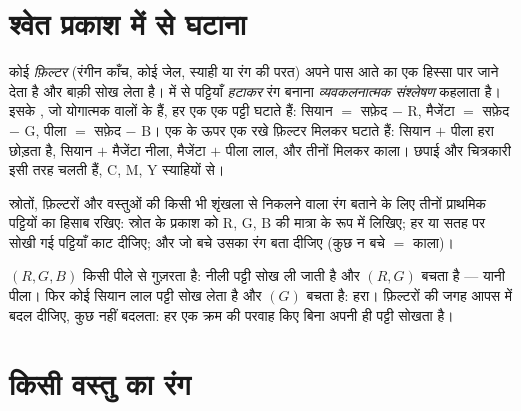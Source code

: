 \section{श्वेत प्रकाश में से घटाना}

\begin{definition}[व्यवकलनात्मक संश्लेषण]\label{def:g11:color-light-sources:subtractive}
कोई \emph{फ़िल्टर} (रंगीन काँच, कोई जेल, स्याही या रंग की
परत) अपने पास आते  का एक हिस्सा पार जाने देता है और बाक़ी
सोख लेता है।  में से पट्टियाँ \emph{हटाकर} रंग बनाना
\emph{व्यवकलनात्मक संश्लेषण} कहलाता है।
इसके , जो योगात्मक वालों के  हैं, हर एक एक पट्टी घटाते
हैं: सियान $=$ सफ़ेद $-$ R, मैजेंटा $=$ सफ़ेद $-$ G, पीला
$=$ सफ़ेद $-$ B। एक के ऊपर एक रखे फ़िल्टर मिलकर घटाते हैं: सियान
$+$ पीला हरा छोड़ता है, सियान $+$ मैजेंटा नीला, मैजेंटा $+$ पीला
लाल, और तीनों मिलकर काला। छपाई और चित्रकारी इसी तरह चलती हैं, C, M, Y
स्याहियों से।
\end{definition}

\begin{method}[वर्णक्रम का हिसाब]\label{met:g11:color-light-sources:bookkeeping}
स्रोतों, फ़िल्टरों और वस्तुओं की किसी भी शृंखला से निकलने वाला
रंग बताने के लिए तीनों प्राथमिक पट्टियों का हिसाब रखिए: स्रोत के प्रकाश
को R, G, B की मात्रा के रूप में लिखिए; हर  या सतह पर सोखी
गई पट्टियाँ काट दीजिए; और जो बचे उसका रंग बता दीजिए (कुछ न बचे $=$
काला)।
\end{method}

\begin{example}[फ़िल्टरों की एक शृंखला]\label{ex:g11:color-light-sources:chain}
 $(R, G, B)$ किसी पीले  से गुज़रता है:
नीली पट्टी सोख ली जाती है और $(R, G)$ बचता है --- यानी पीला। फिर कोई सियान
 लाल पट्टी सोख लेता है और $(G)$ बचता है: हरा।
फ़िल्टरों की जगह आपस में बदल दीजिए, कुछ नहीं बदलता: हर एक क्रम
की परवाह किए बिना अपनी ही पट्टी सोखता है।
\end{example}

\section{किसी वस्तु का रंग}

